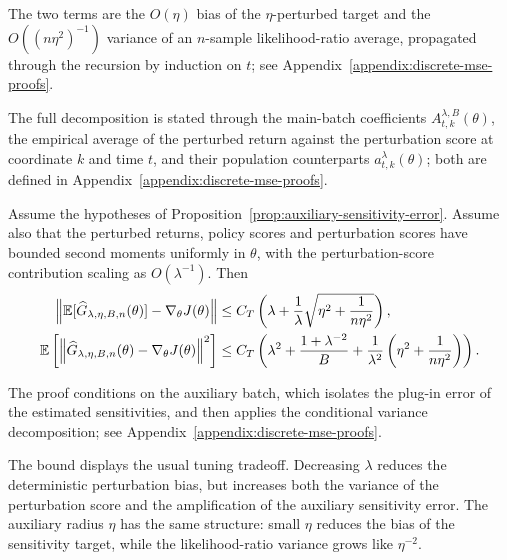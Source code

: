 The two terms are the $O(\eta)$ bias of the $\eta$-perturbed target and the $O((n\eta^2)^{-1})$ variance of an $n$-sample likelihood-ratio average, propagated through the recursion by induction on $t$; see Appendix~\ref{appendix:discrete-mse-proofs}.

The full decomposition is stated through the main-batch coefficients $A_{t,k}^{\lambda,B}(\theta)$, the empirical average of the perturbed return against the perturbation score at coordinate $k$ and time $t$, and their population counterparts $a_{t,k}^\lambda(\theta)$; both are defined in Appendix~\ref{appendix:discrete-mse-proofs}.

\begin{theorem}
    \label{theorem:discrete-mse-decomposition}
    Assume the hypotheses of Proposition~\ref{prop:auxiliary-sensitivity-error}. Assume also that the perturbed returns, policy scores and perturbation scores have bounded second moments uniformly in $\theta$, with the perturbation-score contribution scaling as $O(\lambda^{-1})$. Then
    \begin{align}
        \left\|
            \mathbb{E}[\widehat G_{\lambda,\eta,B,n}(\theta)]
            -
            \nabla_\theta J(\theta)
        \right\|
        &\leq
        C_T\left(
            \lambda
            +
            \frac1{\lambda}
            \sqrt{\eta^2+\frac1{n\eta^2}}
        \right),\\
        \mathbb{E}\left[
            \left\|
                \widehat G_{\lambda,\eta,B,n}(\theta)
                -
                \nabla_\theta J(\theta)
            \right\|^2
        \right]
        &\leq
        C_T\left(
            \lambda^2
            +
            \frac{1+\lambda^{-2}}{B}
            +
            \frac1{\lambda^2}
            \left(\eta^2+\frac1{n\eta^2}\right)
        \right).
    \end{align}
\end{theorem}

The proof conditions on the auxiliary batch, which isolates the plug-in error of the estimated sensitivities, and then applies the conditional variance decomposition; see Appendix~\ref{appendix:discrete-mse-proofs}.

The bound displays the usual tuning tradeoff. Decreasing $\lambda$ reduces the deterministic perturbation bias, but increases both the variance of the perturbation score and the amplification of the auxiliary sensitivity error. The auxiliary radius $\eta$ has the same structure: small $\eta$ reduces the bias of the sensitivity target, while the likelihood-ratio variance grows like $\eta^{-2}$.

